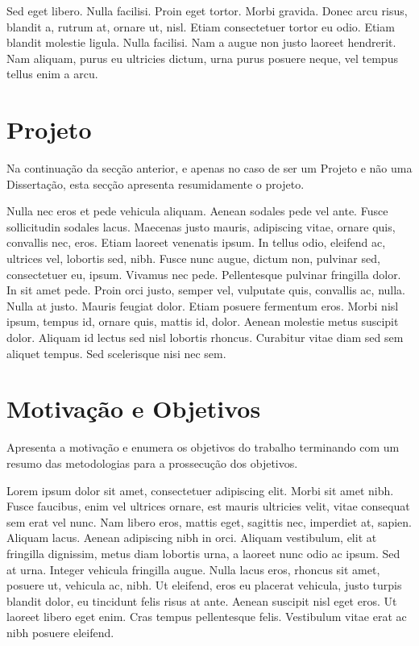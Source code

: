 Sed eget libero. Nulla facilisi. Proin eget tortor. Morbi
gravida. Donec arcu risus, blandit a, rutrum at, ornare ut,
nisl. Etiam consectetuer tortor eu odio. Etiam blandit molestie
ligula. Nulla facilisi. Nam a augue non justo laoreet hendrerit. Nam
aliquam, purus eu ultricies dictum, urna purus posuere neque, vel
tempus tellus enim a arcu.

\section{Projeto} \label{sec:proj}

Na continuação da secção anterior, e apenas no caso de ser um Projeto
e não uma Dissertação, esta secção apresenta resumidamente o projeto.

Nulla nec eros et pede vehicula aliquam. Aenean sodales pede vel
ante. Fusce sollicitudin sodales lacus. Maecenas justo mauris,
adipiscing vitae, ornare quis, convallis nec, eros. Etiam laoreet
venenatis ipsum. In tellus odio, eleifend ac, ultrices vel, lobortis
sed, nibh. Fusce nunc augue, dictum non, pulvinar sed, consectetuer
eu, ipsum. Vivamus nec pede. Pellentesque pulvinar fringilla dolor. In
sit amet pede. Proin orci justo, semper vel, vulputate quis, convallis
ac, nulla. Nulla at justo. Mauris feugiat dolor. Etiam posuere
fermentum eros. Morbi nisl ipsum, tempus id, ornare quis, mattis id,
dolor. Aenean molestie metus suscipit dolor. Aliquam id lectus sed
nisl lobortis rhoncus. Curabitur vitae diam sed sem aliquet
tempus. Sed scelerisque nisi nec sem. 

\section{Motivação e Objetivos} \label{sec:goals}

Apresenta a motivação e enumera os objetivos do trabalho terminando
com um resumo das metodologias para a prossecução dos objetivos.

Lorem ipsum dolor sit amet, consectetuer adipiscing elit. Morbi sit
amet nibh. Fusce faucibus, enim vel ultrices ornare, est mauris
ultricies velit, vitae consequat sem erat vel nunc. Nam libero eros,
mattis eget, sagittis nec, imperdiet at, sapien. Aliquam lacus. Aenean
adipiscing nibh in orci. Aliquam vestibulum, elit at fringilla
dignissim, metus diam lobortis urna, a laoreet nunc odio ac ipsum. Sed
at urna. Integer vehicula fringilla augue. Nulla lacus eros, rhoncus
sit amet, posuere ut, vehicula ac, nibh. Ut eleifend, eros eu placerat
vehicula, justo turpis blandit dolor, eu tincidunt felis risus at
ante. Aenean suscipit nisl eget eros. Ut laoreet libero eget
enim. Cras tempus pellentesque felis. Vestibulum vitae erat ac nibh
posuere eleifend. 


